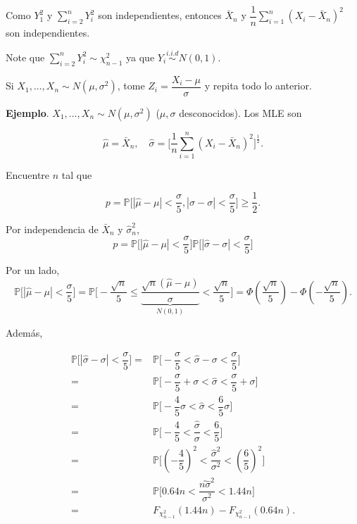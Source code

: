 \documentclass[
  12pt,
]{book}
\begin{document}
Como \(Y_1^2\) y \(\sum_{i=2}^nY_i^2\) son independientes, entonces \(\bar X_n\) y \(\dfrac{1}n \sum_{i=1}^n(X_i-\bar X_n)^2\) son independientes.

Note que \(\sum_{i=2}^n Y_i^2 \sim \chi^2_{n-1}\) ya que \(Y_i \stackrel{i.i.d}{\sim} N(0,1)\).

Si \(X_1,\dots,X_n \sim N(\mu, \sigma^2)\), tome \(Z_i = \dfrac{X_i-\mu}\sigma\) y repita todo lo anterior.

\textbf{Ejemplo}. \(X_1,\dots,X_n\sim N(\mu,\sigma^2)\) (\(\mu,\sigma\) desconocidos). Los MLE son

\[\hat \mu = \bar X_n,\quad \hat\sigma = \bigg[\dfrac{1}{n}\sum_{i=1}^n(X_i-\bar X_n)^2 \bigg]^{\frac 12}.\]

Encuentre \(n\) tal que

\begin{equation*}
p = \mathbb P \bigg[|\hat\mu-\mu|<\dfrac {\sigma}{5}, |\hat\sigma-\sigma|<\dfrac \sigma 5\bigg] \geq \dfrac 12.
\end{equation*}

Por independencia de \(\bar X_n\) y \(\hat\sigma^2_n\),
\[p= \mathbb P \bigg[|\hat\mu-\mu|<\dfrac \sigma5\bigg] \mathbb P \bigg[|\hat\sigma-\sigma|<\dfrac \sigma5\bigg]\]

Por un lado,
\[\mathbb P \bigg[|\hat\mu-\mu|<\dfrac \sigma5\bigg] = \mathbb P \bigg[-\dfrac{\sqrt n}5\leq \underbrace{\dfrac{\sqrt{n}(\hat\mu-\mu)}\sigma}_{N(0,1)} <\dfrac {\sqrt n}{5}\bigg] = \Phi\left(\dfrac{\sqrt n}{5}\right)-\Phi\left(-\dfrac{\sqrt n}{5}\right).\]

Además,

\begin{align*}
\mathbb P \bigg[|\hat\sigma-\sigma|<\dfrac \sigma5\bigg]
=&\mathbb P \bigg[-\dfrac \sigma 5 < \hat\sigma-\sigma<\dfrac \sigma5\bigg] \\
=&\mathbb P \bigg[-\dfrac{\sigma}{5} +\sigma < \hat\sigma<\dfrac \sigma5 +\sigma\bigg] \\
=&\mathbb P \bigg[-\dfrac 45 \sigma < \hat\sigma<\dfrac 65\sigma\bigg] \\
=&\mathbb P \bigg[-\dfrac 45 < \dfrac{\hat\sigma}{\sigma}<\dfrac 65\bigg] \\
=&\mathbb P \bigg[\left(-\dfrac 45\right)^2 < \dfrac{\hat{\sigma}^2}{\sigma^2}<\left(\dfrac 65\right)^2\bigg] \\
=&\mathbb P \bigg[0.64n < \dfrac{\hat{n\sigma}^2}{\sigma^2} <1.44n\bigg] \\
=& F_{\chi^2_{n-1}}(1.44n)-F_{\chi^2_{n-1}}(0.64n).
\end{align*}
\end{document}
